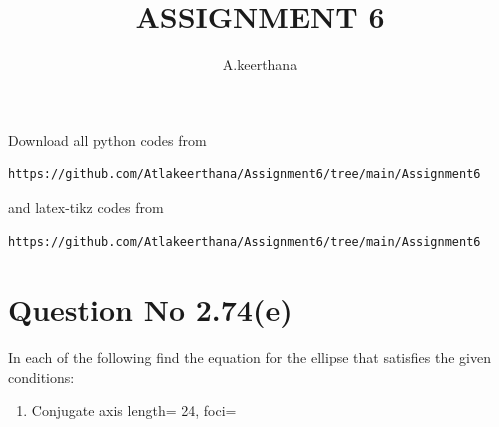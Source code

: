 \documentclass[journal,12pt,twocolumn]{IEEEtran}
\begin{document}
     \def\centbox#1{\makebox[0in]{#1}}
     \def\topbox#1{\raisebox{-\baselineskip}[0in][0in]{#1}}
     \def\midbox#1{\raisebox{-0.5\baselineskip}[0in][0in]{#1}}
\vspace{3cm}
\title{ASSIGNMENT 6}
\author{A.keerthana}
\maketitle
\newpage
\bigskip
\renewcommand{\thefigure}{\theenumi}
\renewcommand{\thetable}{\theenumi}
Download all python codes from 
\begin{lstlisting}
https://github.com/Atlakeerthana/Assignment6/tree/main/Assignment6
\end{lstlisting}
%
and latex-tikz codes from 
%
\begin{lstlisting}
https://github.com/Atlakeerthana/Assignment6/tree/main/Assignment6
\end{lstlisting}
%
\section{Question No 2.74(e)}
In each of the following find the equation for the ellipse that satisfies the given conditions:
\begin{enumerate}[label=\alph*.]
\item Conjugate axis length= 24,
foci= 
\end{enumerate}
%
\end{document}
